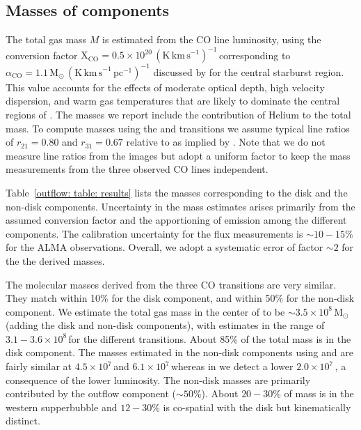 
\subsection{Masses of components}
\label{outflow: section: mass distribution}

The total gas mass $M$ is estimated from the CO line luminosity, using the conversion factor $\mathrm{X}_{\mathrm{CO}} = 0.5\times10^{20}\,(\mathrm{K\,km\,s}^{-1})^{-1}$\,\sqcm corresponding to $\alpha_\mathrm{CO} = 1.1\,\mathrm{M}_\odot\,(\mathrm{K\,km\,s}^{-1}\,\mathrm{pc}^{-1})^{-1}$ discussed by \citet{Leroy:2015ds} for the central starburst region. This value accounts for the effects of moderate optical depth, high velocity dispersion, and warm gas temperatures that are likely to dominate the central regions of . The masses we report include the contribution of Helium to the total mass. To compute masses using the  and  transitions we assume typical line ratios of $r_{21} = 0.80$ and $r_{31} = 0.67$ relative to  as implied by \citet{2018ApJ...867..111Z}. Note that we do not measure line ratios from the images but adopt a uniform factor to keep the mass measurements from the three observed CO lines independent.

Table~\ref{outflow: table: results} lists the masses corresponding to the disk and the non-disk components. Uncertainty in the mass estimates arises primarily from the assumed conversion factor and the apportioning of emission among the different components. The calibration uncertainty for the flux measurements is $\sim10-15\%$ for the ALMA observations. Overall, we adopt a systematic error of factor $\sim2$ for the the derived masses.

The molecular masses derived from the three CO transitions are very similar. They match within 10\% for the disk component, and within 50\% for the non-disk component. We estimate the total gas mass in the center of  to be $\sim 3.5 \times 10^8$\,M$_\odot$ (adding the disk and non-disk components), with estimates in the range of $3.1-3.6 \times 10^8$\,\Msun for the different transitions. About 85\% of the total mass is in the disk component. The masses estimated in the non-disk components using  and  are fairly similar at $4.5 \times 10^7$\,\Msun and $6.1 \times 10^7$\,\Msun whereas in  we detect a lower $2.0 \times 10^7$\,\Msun, a consequence of the lower luminosity. The non-disk masses are primarily contributed by the outflow component ($\sim 50$\%). About $20-30$\% of mass is in the western supperbubble and $12-30$\% is co-spatial with the disk but kinematically distinct.

